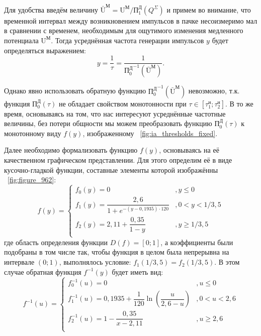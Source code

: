 
Для удобства введём величину $\bar{\text{U}}^\text{М} = \text{U}^\text{М} / \text{П}_{1}^\text{Д}(Q^\Sigma)$ и примем во внимание, что временной интервал между возникновением импульсов в пачке несоизмеримо мал в сравнении с временем, необходимым для ощутимого изменения медленного потенциала $\text{U}^\text{М}$. Тогда усреднённая частота генерации импульсов $y$ будет определяться выражением: 
$$ y = \dfrac{1}{\tau} = \dfrac{1}{{\text{П}_{0}^\text{Д}}^{-1}(\bar{\text{U}}^\text{М})}.$$

Однако явно использовать обратную функцию ${\text{П}_{0}^\text{Д}}^{-1}(\bar{\text{U}}^\text{М})$ невозможно, т.к. функция $\text{П}_{0}^\text{Д}(\tau)$ не обладает свойством монотонности при $\tau \in \left[ \tau_{1}^{\text{н}}; \tau_{2}^{\text{н}} \right]$. В то же время, основываясь на том, что нас интересуют усреднённые частотные величины, без потери общности мы можем преобразовать функцию $\text{П}_{0}^\text{Д}(\tau)$ к монотонному виду $f(y)$, изображенному \onfigure~\ref{fig:ia_thresholds_fixed}.


Далее необходимо формализовать функцию $f(y)$, основываясь на её качественном графическом представлении. Для этого определим её в виде кусочно-гладкой функции, составные элементы которой изображённы \onfigure~\ref{fig:figure_962}:
$$
    f(y) = 
    \begin{cases}
        f_{0}(y) = 0                                            &, y \le 0          \\  
        f_{1}(y) = \dfrac{2,6}{1 + e^{-(y - 0,1935) \cdot 120}} &, 0 < y < 1/3,5    \\
        f_{2}(y) = 2,11 + \dfrac{0,35}{1 - y}                   &, y \ge 1/3,5      \\
    \end{cases}
$$
где область определения функции $D(f) = \left[0; 1\right]$, а коэффициенты были подобраны в том числе так, чтобы функция в целом была непрерывна на интервале $\left(0; 1\right)$, \ie выполнялось условие: $f_{1}(1/3,5) = f_{2}(1/3,5)$. В этом случае обратная функция $f^{-1}(y)$ будет иметь вид:
$$
    f^{-1}(u) = 
    \begin{cases}
        f_{0}^{-1}(u) = 0                                                               &, u \le 0      \\  
        f_{1}^{-1}(u) = 0,1935 + \dfrac{1}{120} \ln\left( \dfrac{u}{2,6 - u} \right)    &, 0 < u < 2,6  \\
        f_{2}^{-1}(u) = 1 - \dfrac{0,35}{x - 2,11}                                      &, u \ge 2,6    \\
    \end{cases}
$$

